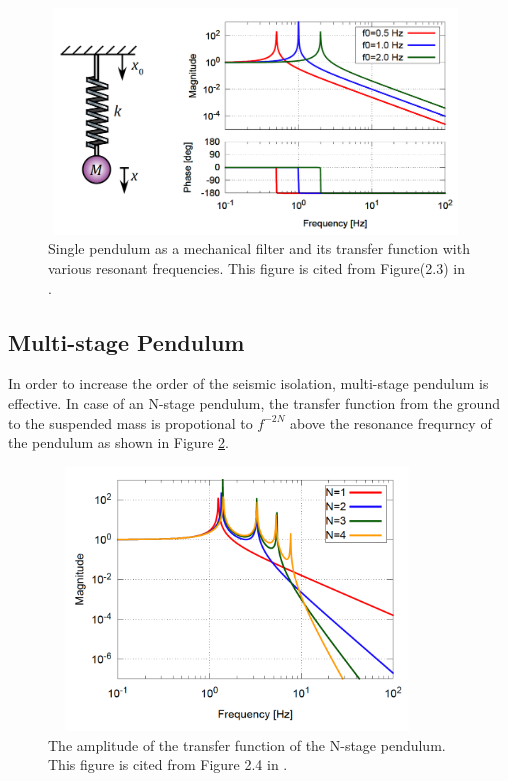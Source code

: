 \begin{figure}[h]
  \begin{center}   
    \includegraphics[width=11cm,height=6cm]{./img_chap5/img501.png}
    \caption{Single pendulum as a mechanical filter and its transfer function with various resonant frequencies. This figure is cited from Figure(2.3) in \cite{sekiguchi2016astudy}.} \label{img:img501}
  \end{center}
\end{figure}

\subsection{Multi-stage Pendulum}
In order to increase the order of the seismic isolation, multi-stage pendulum is effective. In case of an N-stage pendulum, the transfer function from the ground to the suspended mass is propotional to $f^{-2N}$ above the resonance frequrncy of the pendulum as shown in Figure \ref{img:img502}. 
\begin{figure}[h]
  \begin{center}   
    \includegraphics[width=10cm,height=7cm]{./img_chap5/img502.png}
    \caption{The amplitude of the transfer function of the N-stage pendulum. This figure is cited from Figure 2.4 in \cite{sekiguchi2016astudy}.} \label{img:img502}
  \end{center}
\end{figure}


